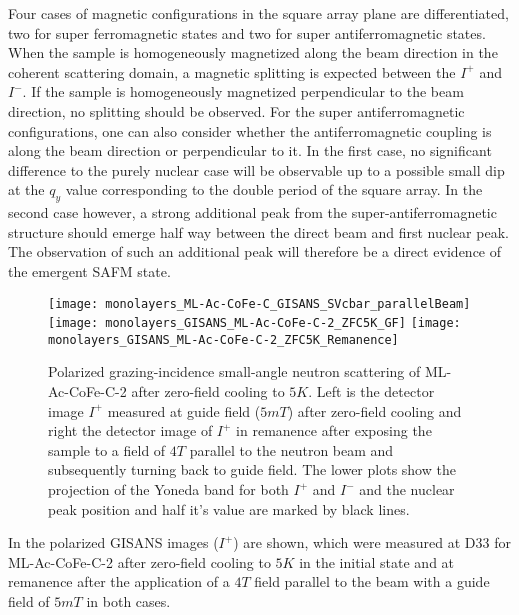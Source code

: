 \documentclass[\main/dresen_thesis.tex]{subfiles}
\begin{document}
  Four cases of magnetic configurations in the square array plane are differentiated, two for super ferromagnetic states and two for super antiferromagnetic states.
  When the sample is homogeneously magnetized along the beam direction in the coherent scattering domain, a magnetic splitting is expected between the $I^{+}$ and $I^{-}$.
  If the sample is homogeneously magnetized perpendicular to the beam direction, no splitting should be observed.
  For the super antiferromagnetic configurations, one can also consider whether the antiferromagnetic coupling is along the beam direction or perpendicular to it.
  In the first case, no significant difference to the purely nuclear case will be observable up to a possible small dip at the $q_y$ value corresponding to the double period of the square array.
  In the second case however, a strong additional peak from the super-antiferromagnetic structure should emerge half way between the direct beam and first nuclear peak.
  The observation of such an additional peak will therefore be a direct evidence of the emergent SAFM state.
  \\

  \begin{figure}[tb]
    \centering
    \texttt{[image: monolayers\_ML-Ac-CoFe-C\_GISANS\_SVcbar\_parallelBeam]}
    \texttt{[image: monolayers\_GISANS\_ML-Ac-CoFe-C-2\_ZFC5K\_GF]}
    \texttt{[image: monolayers\_GISANS\_ML-Ac-CoFe-C-2\_ZFC5K\_Remanence]}
    \caption{\label{fig:monolayer:magneticStructure:polGisans5KZFC}Polarized grazing-incidence small-angle neutron scattering of ML-Ac-CoFe-C-2 after zero-field cooling to $5 \unit{K}$. Left is the detector image $I^{+}$ measured at guide field ($5 \unit{mT}$) after zero-field cooling and right the detector image of $I^{+}$ in remanence after exposing the sample to a field of $4 \unit{T}$ parallel to the neutron beam and subsequently turning back to guide field. The lower plots show the projection of the Yoneda band for both $I^{+}$ and $I^{-}$ and the nuclear peak position and half it's value are marked by black lines.}
  \end{figure}

  In  the polarized GISANS images ($I^{+}$) are shown, which were measured at D33 for ML-Ac-CoFe-C-2 after zero-field cooling to $5 \unit{K}$ in the initial state and at remanence after the application of a $4 \unit{T}$ field parallel to the beam with a guide field of $5 \unit{mT}$ in both cases.
\end{document}
